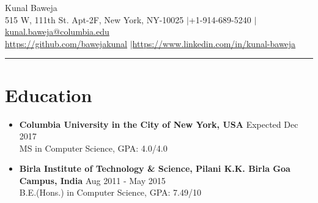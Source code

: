 \documentclass{article}
\def\name{Kunal Baweja}
\begin{document}
\begin{center}
{\huge \name}\\
515 W, 111th St. Apt-2F, New York, NY-10025 $|$\hspace{3pt}+1-914-689-5240 $|$\hspace{3pt}\href{mailto:kunal.baweja@columbia.edu}{kunal.baweja@columbia.edu}\\
\vspace{2pt}
\href{https://github.com/bawejakunal}{https://github.com/bawejakunal} $|$\hspace{3pt}\href{https://www.linkedin.com/in/kunal-baweja}{https://www.linkedin.com/in/kunal-baweja}
\end{center}

\hrule
\vspace{5pt}

\section*{Education}
\begin{itemize}

    \item \textbf{Columbia University in the City of New York, USA} {\hfill Expected Dec 2017}\\
    MS in Computer Science, GPA: 4.0/4.0
    
    \item \textbf{Birla Institute of Technology \& Science, Pilani K.K. Birla Goa Campus, India} {\hfill Aug 2011 - May 2015}\\
    B.E.(Hons.) in Computer Science, GPA: 7.49/10

\end{itemize}
\end{document}
